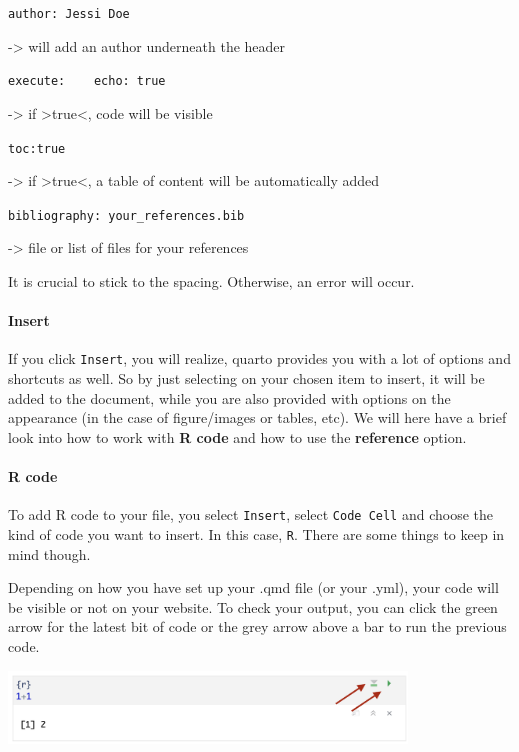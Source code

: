 \documentclass[
  letterpaper,
  DIV=11,
  numbers=noendperiod]{scrreprt}
\let\oldparagraph\paragraph
\renewcommand{\paragraph}[1]{\oldparagraph{#1}\mbox{}}
\begin{document}
\texttt{author:\ Jessi\ Doe}

-\textgreater{} will add an author underneath the header

\texttt{execute:\ \ \ \ echo:\ true}

-\textgreater{} if \textgreater true\textless, code will be visible

\texttt{toc:true}

-\textgreater{} if \textgreater true\textless, a table of content will
be automatically added

\texttt{bibliography:\ your\_references.bib}

-\textgreater{} file or list of files for your references

It is crucial to stick to the spacing. Otherwise, an error will occur.

\hypertarget{insert}{%
\paragraph{Insert}\label{insert}}

If you click \texttt{Insert}, you will realize, quarto provides you with
a lot of options and shortcuts as well. So by just selecting on your
chosen item to insert, it will be added to the document, while you are
also provided with options on the appearance (in the case of
figure/images or tables, etc). We will here have a brief look into how
to work with \textbf{R code} and how to use the \textbf{reference}
option.

\hypertarget{r-code}{%
\paragraph{R code}\label{r-code}}

To add R code to your file, you select \texttt{Insert}, select
\texttt{Code\ Cell} and choose the kind of code you want to insert. In
this case, \texttt{R}. There are some things to keep in mind though.

Depending on how you have set up your .qmd file (or your .yml), your
code will be visible or not on your website. To check your output, you
can click the green arrow for the latest bit of code or the grey arrow
above a bar to run the previous code.

\includegraphics[width=4.16667in,height=\textheight]{img/quarto_intro/Screenshot 2023-10-11 at 15.04.31.png}
\end{document}
